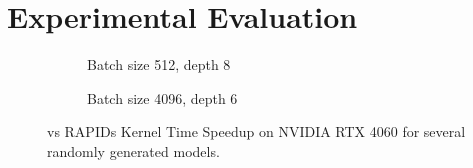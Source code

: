 \section{Experimental Evaluation}
\label{sec:results}

\begin{figure}[ht]
  \centering
  \begin{subfigure}[b]{.45\textwidth}
    \caption{Batch size 512, depth 8}
  \end{subfigure}
  \begin{subfigure}[b]{.45\textwidth}
    \caption{Batch size 4096, depth 6}
  \end{subfigure}
  \hfill
  \caption{\Treebeard{} vs RAPIDs Kernel Time Speedup on NVIDIA RTX 4060 for several randomly generated models.}
\end{figure}

